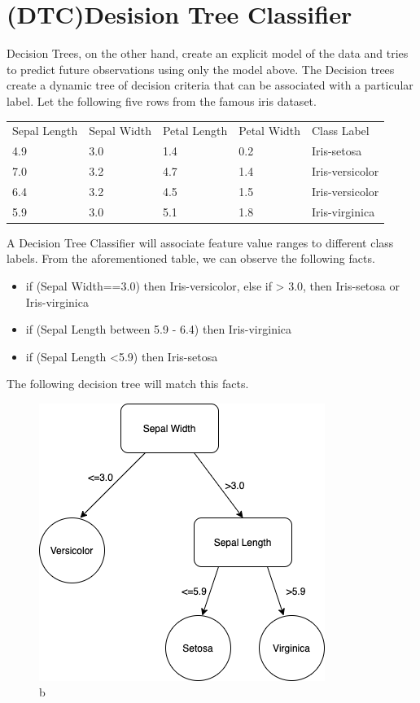 \documentclass[openany]{book}
\begin{document}
		\section{(DTC)Desision Tree Classifier}
			Decision Trees, on the other hand, create an explicit model of the data and tries to predict future observations using only the model above. The Decision trees create
			a dynamic tree of decision criteria that can be associated with a particular label. Let the following five rows from the famous iris dataset.
			\begin{table}[H]
				\centering
				\begin{tabular}{lllll}
					Sepal Length & Sepal Width & Petal Length & Petal Width & Class Label     \\
					4.9 & 3.0 & 1.4 & 0.2 & Iris-setosa     \\
					7.0 & 3.2 & 4.7 & 1.4 & Iris-versicolor \\
					6.4 & 3.2 & 4.5 & 1.5 & Iris-versicolor \\
					5.9 & 3.0 & 5.1 & 1.8 & Iris-virginica 
				\end{tabular}
			\end{table}
			A Decision Tree Classifier will associate feature value ranges to different class labels. From the aforementioned table, we can observe the following facts.
			\begin{itemize}
				\item if (Sepal Width==3.0) then Iris-versicolor, else if > 3.0, then Iris-setosa or Iris-virginica
				\item if (Sepal Length between 5.9 - 6.4) then Iris-virginica
				\item if (Sepal Length <5.9) then Iris-setosa
			\end{itemize}
			The following decision tree will match this facts.
			\begin{figure}[H]
				\iftrue
				\centering
				\caption{b}
				\includegraphics[scale=0.5]{res/dt}
				\fi
			\end{figure}
\end{document}
